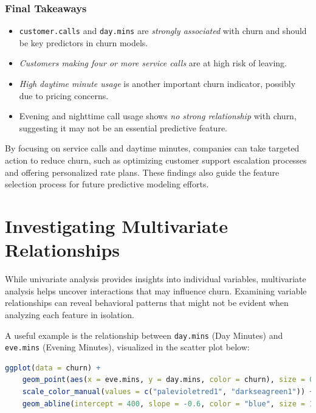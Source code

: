 \documentclass[
]{book}
\newcommand{\passthrough}[1]{#1}
\providecommand{\tightlist}{%
  \setlength{\itemsep}{0pt}\setlength{\parskip}{0pt}}
\theoremstyle{definition}
\theoremstyle{definition}
\theoremstyle{definition}
\theoremstyle{definition}
\theoremstyle{remark}
\begin{document}
\subsubsection*{Final Takeaways}\label{final-takeaways}

\begin{itemize}
\tightlist
\item
  \passthrough{\lstinline!customer.calls!} and \passthrough{\lstinline!day.mins!} are \emph{strongly associated} with churn and should be key predictors in churn models.\\
\item
  \emph{Customers making four or more service calls} are at high risk of leaving.\\
\item
  \emph{High daytime minute usage} is another important churn indicator, possibly due to pricing concerns.\\
\item
  Evening and nighttime call usage shows \emph{no strong relationship} with churn, suggesting it may not be an essential predictive feature.
\end{itemize}

By focusing on service calls and daytime minutes, companies can take targeted action to reduce churn, such as optimizing customer support escalation processes and offering personalized rate plans. These findings also guide the feature selection process for future predictive modeling efforts.

\section{Investigating Multivariate Relationships}\label{EDA-sec-multivariate}

While univariate analysis provides insights into individual variables, multivariate analysis helps uncover interactions that may influence churn. Examining variable relationships can reveal behavioral patterns that might not be evident when analyzing each feature in isolation.

A useful example is the relationship between \passthrough{\lstinline!day.mins!} (Day Minutes) and \passthrough{\lstinline!eve.mins!} (Evening Minutes), visualized in the scatter plot below:

\begin{lstlisting}[language=R]
ggplot(data = churn) +
    geom_point(aes(x = eve.mins, y = day.mins, color = churn), size = 0.7, alpha = 0.8) +
    scale_color_manual(values = c("palevioletred1", "darkseagreen1")) +
    geom_abline(intercept = 400, slope = -0.6, color = "blue", size = 1)
\end{lstlisting}
\end{document}
